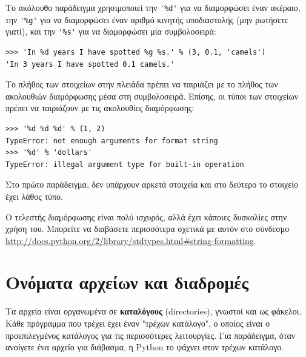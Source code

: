 \documentclass[10pt]{book}
\begin{document}
Το ακόλουθο παράδειγμα χρησιμοποιεί την \verb"'%d'" για να διαμορφώσει έναν ακέραιο, την \verb"'%g'" για να 
διαμορφώσει έναν αριθμό κινητής υποδιαστολής (μην ρωτήσετε γιατί), και την \verb"'%s'" για να διαμορφώσει μία συμβολοσειρά:

\begin{verbatim}
>>> 'In %d years I have spotted %g %s.' % (3, 0.1, 'camels')
'In 3 years I have spotted 0.1 camels.'
\end{verbatim}
%
 
Το πλήθος των στοιχείων στην πλειάδα πρέπει να ταιριάζει με το πλήθος των ακολουθιών διαμόρφωσης μέσα στη συμβολοσειρά. Επίσης, οι τύποι των στοιχείων πρέπει να ταιριάζουν με τις ακολουθίες διαμόρφωσης:

\begin{verbatim}
>>> '%d %d %d' % (1, 2)
TypeError: not enough arguments for format string
>>> '%d' % 'dollars'
TypeError: illegal argument type for built-in operation
\end{verbatim}
%
Στο πρώτο παράδειγμα, δεν υπάρχουν αρκετά στοιχεία και στο δεύτερο το στοιχείο έχει λάθος τύπο.

Ο τελεστής διαμόρφωσης είναι πολύ ισχυρός, αλλά έχει κάποιες δυσκολίες στην χρήση του. Μπορείτε να διαβάσετε περισσότερα σχετικά με αυτόν στο σύνδεσμο \url{http://docs.python.org/2/library/stdtypes.html#string-formatting}. 




\section{Ονόματα αρχείων και διαδρομές}
\label{paths}

Τα αρχεία είναι οργανωμένα σε {\bf καταλόγους} (directories), γνωστοί και ως φάκελοι. Κάθε πρόγραμμα που τρέχει έχει έναν "τρέχων κατάλογο", ο οποίος είναι ο προεπιλεγμένος κατάλογος για τις περισσότερες λειτουργίες. Για παράδειγμα, όταν ανοίγετε ένα αρχείο για διάβασμα, η Python το ψάχνει στον τρέχων κατάλογο.
\end{document}
